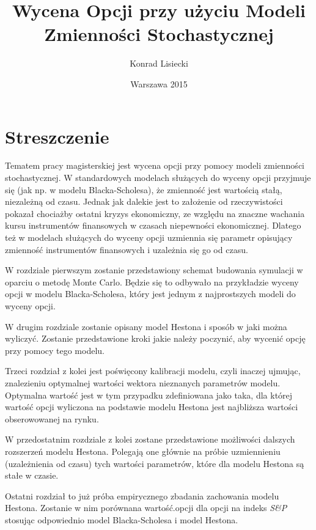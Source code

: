 \documentclass{pracamgr}
\author{Konrad Lisiecki}
\title{Wycena Opcji przy użyciu Modeli Zmienności Stochastycznej}
\date{Warszawa 2015}
\begin{document}
\maketitle
\nocite{book-full} 

\chapter*{Streszczenie} 


Tematem pracy magisterskiej jest wycena opcji przy pomocy modeli zmienności stochastycznej. 
W standardowych modelach służących do wyceny opcji przyjmuje się (jak np. w modelu 
Blacka-Scholesa), że zmienność jest wartością stałą, niezależną od czasu. 
Jednak jak dalekie jest to założenie od rzeczywistości pokazał chociażby ostatni kryzys 
ekonomiczny, ze względu na znaczne wachania kursu instrumentów finansowych w czasach niepewności 
ekonomicznej. Dlatego też w modelach służących do wyceny opcji uzmiennia się parametr opisujący 
zmienność instrumentów finansowych i uzależnia się go od czasu. 


W rozdziale pierwszym zostanie przedstawiony schemat budowania symulacji w oparciu o metodę
Monte Carlo. Będzie się to odbywało na przykładzie wyceny opcji w modelu Blacka-Scholesa, który 
jest jednym z najprostszych modeli do wyceny opcji.

W drugim rozdziale zostanie opisany model Hestona i sposób w jaki można wyliczyć. 
Zostanie przedstawione kroki jakie należy poczynić, aby wycenić opcję przy pomocy tego modelu.

Trzeci rozdział z kolei jest poświęcony kalibracji modelu, czyli inaczej ujmując, znalezieniu 
optymalnej wartości wektora nieznanych parametrów modelu. Optymalna wartość jest w tym przypadku zdefiniowana
jako taka, dla której wartość opcji wyliczona na podstawie modelu Hestona jest najbliższa wartości 
obserowowanej na rynku.

W przedostatnim rozdziale z kolei zostane przedstawione możliwości dalszych rozszerzeń modelu Hestona. 
Polegają one głównie na próbie uzmiennieniu (uzależnienia od czasu) tych wartości parametrów, które dla 
modelu Hestona są stałe w czasie.

Ostatni rozdział to już próba empirycznego zbadania zachowania modelu Hestona. Zostanie w nim porównana
wartość.opcji dla opcji na indeks \textit{S&P} stosując odpowiednio model Blacka-Scholesa i model Hestona.
\end{document}
